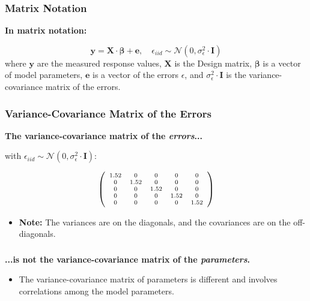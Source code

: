 \documentclass{beamer}
\begin{document}
\begin{frame}
  \frametitle{Matrix Notation}
  \textbf{In matrix notation:}
  
  \begin{equation*}
  \mathbf{y} = \mathbf{X} \cdot \mathbf{\beta} + \mathbf{e}, \quad \epsilon_{iid} \sim \mathcal{N}(0, \sigma^2_{\epsilon} \cdot \mathbf{I})
  \end{equation*}
  where $\mathbf{y}$ are the measured response values, $\mathbf{X}$ is the Design matrix, $\mathbf{\beta}$ is a vector of model parameters, $\mathbf{e}$ is a vector of the errors $\epsilon$, and $\sigma^2_{\epsilon} \cdot \mathbf{I}$ is the variance-covariance matrix of the errors.
\end{frame}

\begin{frame}
  \frametitle{Variance-Covariance Matrix of the Errors}
  \textbf{The variance-covariance matrix of the \textit{errors}...}

  with $\epsilon_{iid} \sim \mathcal{N}(0, \sigma^2_{\epsilon} \cdot \mathbf{I})$:
  
  \begin{equation*}
  \scriptsize{\left( \begin{array}{ccccc} 1.52 & 0 & 0 & 0 & 0 \\ 0 & 1.52 & 0 & 0 & 0 \\ 0 & 0 & 1.52 & 0 & 0 \\ 0 & 0 & 0 & 1.52 & 0 \\ 0 & 0 & 0 & 0 & 1.52 \end{array}\right)}
  \end{equation*}

  \begin{itemize}
    \item \textbf{Note:} The variances are on the diagonals, and the covariances are on the off-diagonals.
  \end{itemize}
\end{frame}

\begin{frame}
  \frametitle{}
  \textbf{...is not the variance-covariance matrix of the \textit{parameters}.}
  
  \begin{itemize}
    \item The variance-covariance matrix of parameters is different and involves correlations among the model parameters.
  \end{itemize}
\end{frame}
\end{document}
